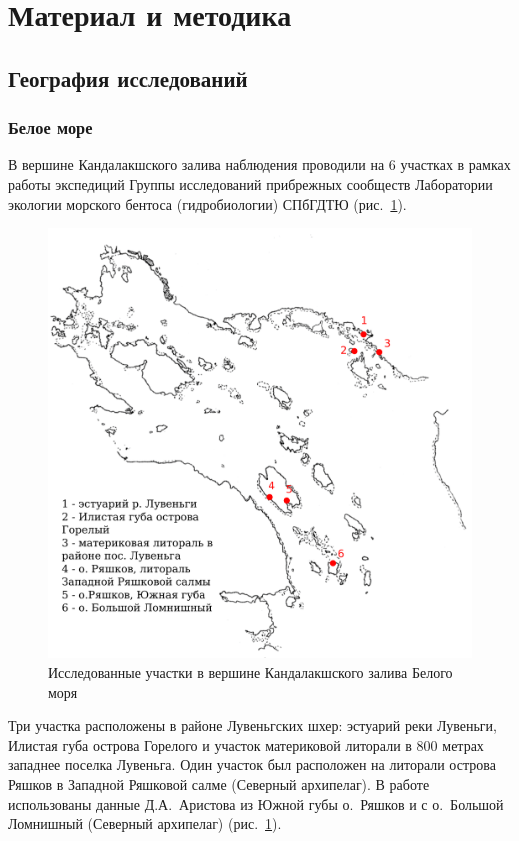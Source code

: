 \section{Материал и методика}
	\subsection{География исследований}

		\subsubsection{Белое море}
В вершине Кандалакшского залива наблюдения проводили на $6$ участках в рамках работы экспедиций Группы исследований прибрежных сообществ Лаборатории экологии морского бентоса (гидробиологии) СПбГДТЮ (рис.~\ref{ris:karta_Kandalaksha}). 
    \begin{figure}
    \includegraphics[width=\textwidth]{../maps/map_Kandalaksha.pdf}
    \caption{Исследованные участки в вершине Кандалакшского залива Белого моря}
    \label{ris:karta_Kandalaksha}
    \end{figure}
Три участка расположены в районе Лувеньгских шхер: эстуарий реки Лувеньги, Илистая губа острова Горелого и участок материковой литорали в 800 метрах западнее поселка Лувеньга.
Один участок был расположен на литорали острова Ряшков в Западной Ряшковой салме (Северный архипелаг).
В работе использованы данные Д.\:А.~Аристова из Южной губы о.~Ряшков и с о.~Большой Ломнишный (Северный архипелаг) (рис.~\ref{ris:karta_Kandalaksha}). 

